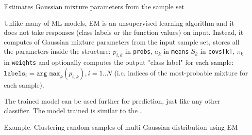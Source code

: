 Estimates Gaussian mixture parameters from the sample set


Unlike many of ML models, EM is an unsupervised learning algorithm and it does not take responses (class labels or the function values) on input. Instead, it computes  of Gaussian mixture parameters from the input sample set, stores all the parameters inside the structure: $p_{i,k}$ in \texttt{probs}, $a_k$ in \texttt{means} $S_k$ in \texttt{covs[k]}, $\pi_k$ in \texttt{weights} and optionally computes the output "class label" for each sample: $\texttt{labels}_i=\texttt{arg max}_k(p_{i,k}), i=1..N$ (i.e. indices of the most-probable mixture for each sample).

The trained model can be used further for prediction, just like any other classifier. The model trained is similar to the .


Example. Clustering random samples of multi-Gaussian distribution using EM

